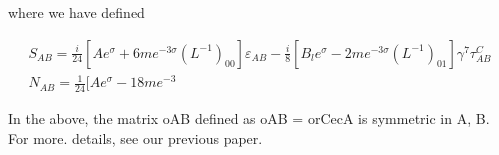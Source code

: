 \documentclass{article}
\begin{document}
where we have defined


\begin{equation}
\begin{array} { c } { S _ { A B } = \frac { i } { 2 4 } [ A e ^ { \sigma } + 6 m e ^ { - 3 \sigma } ( L ^ { - 1 } ) _ { 0 0 } ] \varepsilon _ { A B } - \frac { i } { 8 } [ B _ { l } e ^ { \sigma } - 2 m e ^ { - 3 \sigma } ( L ^ { - 1 } ) _ { 0 1 } ] \gamma ^ { 7 } \tau _ { A B } ^ { C } } \\ { N _ { A B } = \frac { 1 } { 2 4 } [ A e ^ { \sigma } - 1 8 m e ^ { - 3}}\end{array}
\end{equation}


In the above, the matrix oAB defined as oAB = orCecA is symmetric in A, B. For more.
details, see our previous paper.
\end{document}
